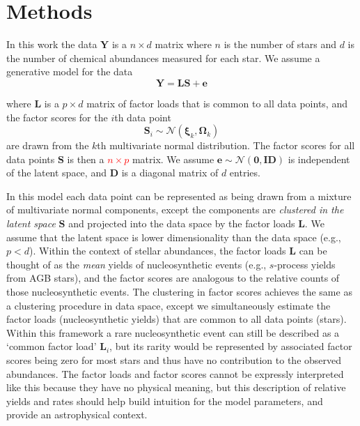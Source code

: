 \documentclass[twocolumn]{aastex61}
\newcommand{\todo}[1]{\textcolor{red}{#1}}
\newcommand{\vect}[1]{\boldsymbol{\mathbf{#1}}}
\renewcommand{\vec}[1]{\vect{#1}}
\newcommand{\data}{\textbf{Y}}
\newcommand{\vecdata}{\vec\data}
\newcommand{\eye}{\textbf{I}}
\newcommand{\factorloads}{\textbf{L}}
\newcommand{\factorscores}{\textbf{S}}
\newcommand{\specificvariance}{\vec{D}}
\begin{document}
\section{Methods} \label{sec:methods}



In this work the data $\vecdata$ is a $n \times d$ matrix 
where $n$ is the number of stars and $d$ is the number of
chemical abundances measured for each star. We assume a
generative model for the data 
\begin{equation}
	\vecdata = \factorloads\factorscores + \vec{e}
	\label{eq:generative-model}
\end{equation}

\noindent{}where $\factorloads$ is a $p \times d$ matrix of factor
loads that is common to all data points, and the factor scores for
the $i$th data point
\begin{equation}
	\factorscores_i \sim \mathcal{N}(\vec\xi_k, \vec\Omega_k)
\end{equation}
\noindent{}are drawn from the $k$th multivariate  normal distribution.
The factor scores for all data points $\factorscores$ is then a 
\todo{$n \times p$} matrix.
 We assume $\vec{e} \sim \mathcal{N}\left(\vec{0}, \eye\specificvariance\right)$
is independent of the latent space, and $\specificvariance$ is a
diagonal matrix of $d$ entries. 

In this model each data point can be represented as being drawn
from a mixture of multivariate normal components, except the components
are \emph{clustered in the latent space} $\factorscores$ and projected
into the data space by the factor loads $\factorloads$. 
We assume that the latent space is lower dimensionality than the
data space (e.g., $p < d$).
Within the context of stellar abundances, the factor loads
$\factorloads$ can be thought of as the \emph{mean} yields
of nucleosynthetic
events (e.g., $s$-process yields from AGB stars), and the
factor scores are analogous to the relative counts of those 
nucleosynthetic events. The clustering in factor scores
achieves the same as a clustering procedure in data space,
except we simultaneously estimate the factor loads
(nucleosynthetic yields) that are common to all data points 
(stars). Within this framework a rare nucleosynthetic event
can still be described as a `common factor load' $\factorloads_i$, 
but its rarity would be represented by associated factor
scores being zero for most stars and thus have no contribution
to the observed abundances. The factor loads and factor scores 
cannot be expressly interpreted like this because they have no
physical meaning, but this description of relative yields and 
rates should help build intuition for the model parameters,
and provide an astrophysical context.
\end{document}
